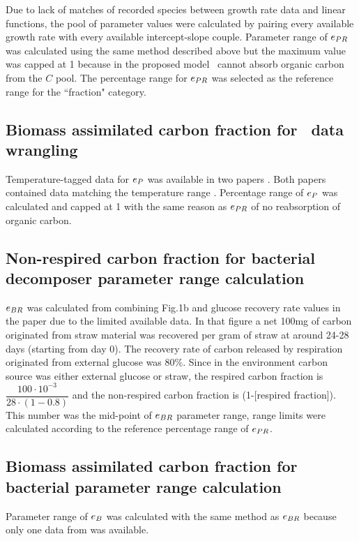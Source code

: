 \documentclass[../thesis.tex]{subfiles} %
\begin{document}
Due to lack of matches of recorded species between growth rate data and linear functions, the pool of parameter values were calculated by pairing every available growth rate with every available intercept-slope couple.  Parameter range of $e_{PR}$ was calculated using the same method described above but the maximum value was capped at 1 because in the proposed model \phy\ cannot absorb organic carbon from the $C$ pool.  The percentage range for $e_{PR}$ was selected as the reference range for the ``fraction" category.

\subsection{Biomass assimilated carbon fraction for \phy\ data wrangling}
Temperature-tagged data for $e_P$ was available in two papers \autocite{j1989respiration,samejima1958heterotrophic}.  Both papers contained data matching the temperature range \temp.  Percentage range of $e_P$ was calculated and capped at 1 with the same reason as $e_{PR}$ of no reabsorption of organic carbon.

\subsection{Non-respired carbon fraction for bacterial decomposer parameter range calculation}
$e_{BR}$ was calculated from combining Fig.1b and glucose recovery rate values in the paper \autocite{cochran1988estimation} due to the limited available data.  In that figure a net 100mg of carbon originated from straw material was recovered per gram of straw at around 24-28 days (starting from day 0).  The recovery rate of carbon released by respiration originated from external glucose was 80\%.  Since in the environment carbon source was either external glucose or straw, the respired carbon fraction is $\dfrac{100\cdot10^{-3}}{28\cdot(1-0.8)}$ and the non-respired carbon fraction is (1-[respired fraction]).  This number was the mid-point of $e_{BR}$ parameter range, range limits were calculated according to the reference percentage range of $e_{PR}$.

\subsection{Biomass assimilated carbon fraction for bacterial parameter range calculation}
Parameter range of $e_B$ was calculated with the same method as $e_{BR}$ because only one data from  \autocite{cochran1988estimation} was available.
\end{document}
